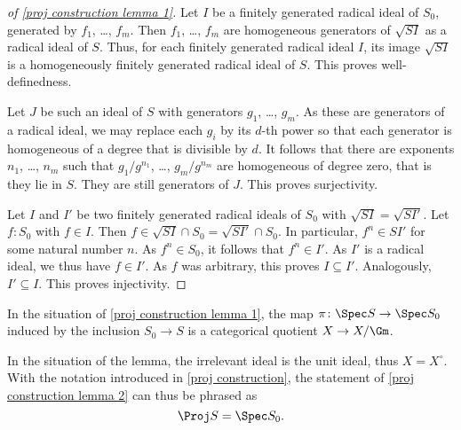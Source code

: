 \begin{proof}[of \cref{proj construction lemma 1}]
  Let $I$ be a finitely generated radical ideal of $S_0$, generated by
  $f_1$, \dots, $f_m$.  Then $f_1$, \dots, $f_m$ are homogeneous generators of
  $\sqrt{SI}$ as a radical ideal of $S$.  Thus, for each finitely generated
  radical ideal $I$, its image $\sqrt{SI}$ is a homogeneously finitely
  generated radical ideal of $S$.  This proves well-definedness.

  Let $J$ be such an ideal of $S$ with
  generators $g_1$, \dots, $g_m$.  As these are generators of a
  radical ideal, we may replace each $g_i$ by its $d$-th power so that
  each generator is homogeneous of a degree that is divisible by $d$.
  It follows that there are exponents $n_1$, \dots, $n_m$ such that
  $g_1/g^{n_1}$, \dots, $g_m/g^{n_m}$ are homogeneous of degree zero,
  that is they lie in $S$.  They are still generators of $J$.  This
  proves surjectivity.

  Let $I$ and $I'$ be two finitely generated radical ideals of $S_0$
  with $\sqrt{SI} = \sqrt{SI'}$.  Let $f\colon S_0$ with $f \in I$.  Then $f \in \sqrt{SI}
  \cap S_0 = \sqrt{SI'} \cap S_0$.  In particular, $f^n \in SI'$ for
  some natural number $n$.  As $f^n \in S_0$, it follows that $f^n \in
  I'$.  As $I'$ is a radical ideal, we thus have $f \in I'$.  As $f$
  was arbitrary, this proves $I \subseteq I'$.  Analogously, $I'
  \subseteq I$.  This proves injectivity.
\end{proof}

\begin{lemma}\label{proj construction lemma 2}
  In the situation of \cref{proj construction lemma 1}, the map
  $\pi\colon \Spec S \to \Spec S_0$ induced by the inclusion $S_0 \to
  S$ is a categorical quotient $X \to X/\Gm$.
\end{lemma}

\begin{remark}
  In the situation of the lemma, the irrelevant ideal is the unit
  ideal, thus $X = X^\circ$.  With the notation introduced in
  \cref{proj construction}, the statement of \cref{proj construction lemma 2} can thus be phrased as
  \begin{equation*}
    \Proj S = \Spec S_0.
  \end{equation*}
\end{remark}


